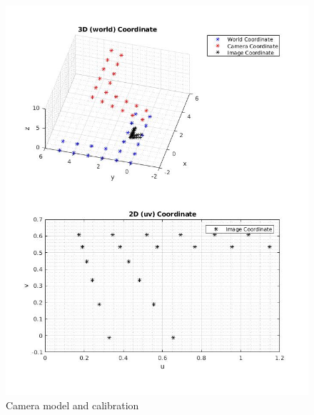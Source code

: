 \documentclass[]{article}
\begin{document}
\newpage
\begin{figure}[h!]
	\includegraphics[width=\linewidth]{1a.jpg}
	\caption{Camera model and calibration}
	\label{fig:fig1}
\end{figure}

\newpage
\end{document}
